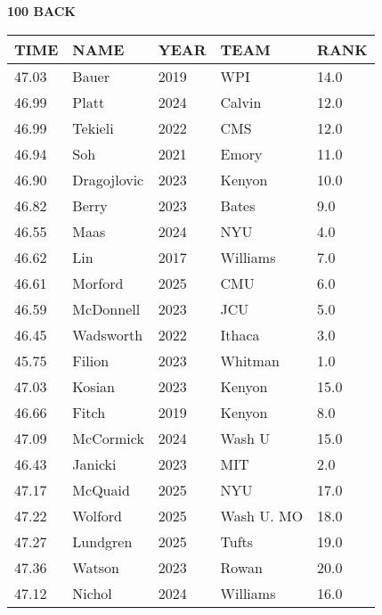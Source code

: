 \begin{minipage}[t]{0.48\textwidth}
\centering
\textbf{100 BACK}\\[0.05cm]
\begin{tabular}{@{}p{1.8cm}p{2.8cm}p{1.2cm}p{1.4cm}p{0.8cm}@{}}
\hline
\textbf{TIME} & \textbf{NAME} & \textbf{YEAR} & \textbf{TEAM} & \textbf{RANK} \\
\hline
47.03 & Bauer & 2019 & WPI & 14.0 \\
46.99 & Platt & 2024 & Calvin & 12.0 \\
46.99 & Tekieli & 2022 & CMS & 12.0 \\
46.94 & Soh & 2021 & Emory & 11.0 \\
46.90 & Dragojlovic & 2023 & Kenyon & 10.0 \\
46.82 & Berry & 2023 & Bates & 9.0 \\
46.55 & Maas & 2024 & NYU & 4.0 \\
46.62 & Lin & 2017 & Williams & 7.0 \\
46.61 & Morford & 2025 & CMU & 6.0 \\
46.59 & McDonnell & 2023 & JCU & 5.0 \\
46.45 & Wadsworth & 2022 & Ithaca & 3.0 \\
45.75 & Filion & 2023 & Whitman & 1.0 \\
47.03 & Kosian & 2023 & Kenyon & 15.0 \\
46.66 & Fitch & 2019 & Kenyon & 8.0 \\
47.09 & McCormick & 2024 & Wash U & 15.0 \\
46.43 & Janicki & 2023 & MIT & 2.0 \\
47.17 & McQuaid & 2025 & NYU & 17.0 \\
47.22 & Wolford & 2025 & Wash U. MO & 18.0 \\
47.27 & Lundgren & 2025 & Tufts & 19.0 \\
47.36 & Watson & 2023 & Rowan & 20.0 \\
47.12 & Nichol & 2024 & Williams & 16.0 \\
\hline
\end{tabular}
\end{minipage}\hfill
